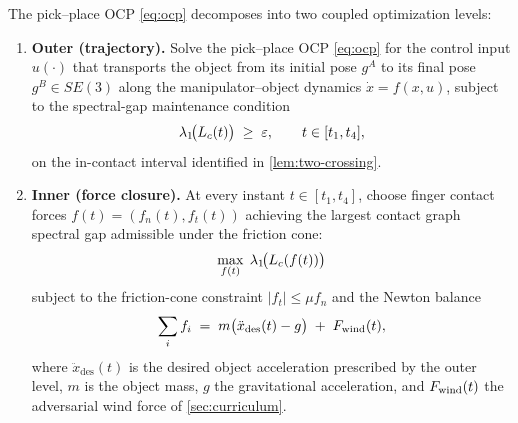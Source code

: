 \begin{definition}\label{def:bilevel}
The pick--place OCP \eqref{eq:ocp} decomposes into two coupled
optimization levels:
\begin{enumerate}[label=(\roman*),nosep]
  \item \textbf{Outer (trajectory).} Solve the pick--place OCP
    \eqref{eq:ocp} for the control input $u(\cdot)$ that
    transports the object from its initial pose $g^{A}$ to its
    final pose $g^{B} \in SE(3)$ along the manipulator--object
    dynamics $\dot x = f(x, u)$, subject to the spectral-gap
    maintenance condition
    \begin{equation}
    \label{eq:bilevel-outer}
      \lambda_{1}\!\bigl(L_{c}(t)\bigr) \;\ge\; \varepsilon,
      \qquad t \in [t_{1}, t_{4}],
    \end{equation}
    on the in-contact interval identified in
    \cref{lem:two-crossing}.
  \item \textbf{Inner (force closure).} At every instant
    $t \in [t_{1}, t_{4}]$, choose finger contact forces
    $f(t) = (f_{n}(t), f_{t}(t))$ achieving the largest contact
    graph spectral gap admissible under the friction cone:
    \begin{equation}
    \label{eq:bilevel-inner}
      \max_{f(t)} \;
      \lambda_{1}\!\bigl(L_{c}(f(t))\bigr)
    \end{equation}
    subject to the friction-cone constraint
    $|f_{t}| \le \mu f_{n}$ and the Newton balance
    \begin{equation}
    \label{eq:newton-balance}
      \sum_{i} f_{i}
      \;=\;
      m\bigl(\ddot{x}_{\mathrm{des}}(t) - g\bigr)
      \;+\; F_{\mathrm{wind}}(t),
    \end{equation}
    where $\ddot{x}_{\mathrm{des}}(t)$ is the desired object
    acceleration prescribed by the outer level, $m$ is the object
    mass, $g$ the gravitational acceleration, and $F_{\mathrm{wind}}(t)$ the
    adversarial wind force of \cref{sec:curriculum}.
\end{enumerate}
\end{definition}


